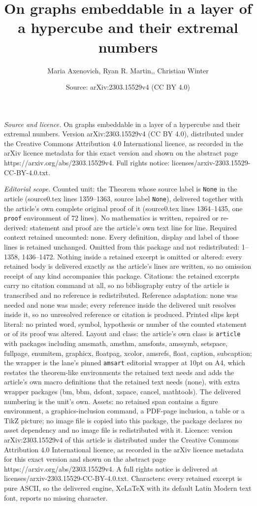 \documentclass[10pt,a4paper]{amsart}
\title[On graphs embeddable in a layer of a hypercube and their ext]{On graphs embeddable in a layer of a hypercube and their extremal numbers}
\author{Maria Axenovich, Ryan R. Martin,, Christian Winter}
\date{Source: arXiv:2303.15529v4 (CC BY 4.0)}
\begin{document}
\maketitle

\noindent\emph{Source and licence.} On graphs embeddable in a layer of a hypercube and their extremal numbers. Version arXiv:2303.15529v4 (CC BY 4.0), distributed under the Creative Commons Attribution 4.0 International licence, as recorded in the arXiv licence metadata for this exact version and shown on the abstract page https://arxiv.org/abs/2303.15529v4. Full rights notice: licenses/arxiv-2303.15529-CC-BY-4.0.txt.\par\smallskip

\noindent\textit{Editorial scope.} Counted unit: the Theorem whose source label is \texttt{None} in the article (source0.tex lines 1359--1363, source label \texttt{None}), delivered together with the article's own complete original proof of it (source0.tex lines 1364--1435, one \texttt{proof} environment of 72 lines). No mathematics is written, repaired or re-derived: statement and proof are the article's own text line for line. Required context retained uncounted: none. Every definition, display and label of those lines is retained unchanged. Omitted from this package and not redistributed: 1--1358, 1436--1472. Nothing inside a retained excerpt is omitted or altered: every retained body is delivered exactly as the article's lines are written, so no omission receipt of any kind accompanies this package. Citations: the retained excerpts carry no citation command at all, so no bibliography entry of the article is transcribed and no reference is redistributed. Reference adaptation: none was needed and none was made; every reference inside the delivered unit resolves inside it, so no unresolved reference or citation is produced. Printed slips kept literal: no printed word, symbol, hypothesis or number of the counted statement or of its proof was altered. Layout and class: the article's own class is \texttt{article} with packages including amsmath, amsthm, amsfonts, amssymb, setspace, fullpage, enumitem, graphicx, floatpag, xcolor, amsrefs, float, caption, subcaption; the wrapper is the lane's pinned \texttt{amsart} editorial wrapper at 10pt on A4, which restates the theorem-like environments the retained text needs and adds the article's own macro definitions that the retained text needs (none), with extra wrapper packages (bm, bbm, dsfont, xspace, cancel, mathtools). The delivered numbering is the unit's own. Assets: no retained span contains a figure environment, a graphics-inclusion command, a PDF-page inclusion, a table or a TikZ picture; no image file is copied into this package, the package declares no asset dependency and no image file is redistributed with it. Licence: version arXiv:2303.15529v4 of this article is distributed under the Creative Commons Attribution 4.0 International licence, as recorded in the arXiv licence metadata for this exact version and shown on the abstract page https://arxiv.org/abs/2303.15529v4. A full rights notice is delivered at licenses/arxiv-2303.15529-CC-BY-4.0.txt. Characters: every retained excerpt is pure ASCII, so the delivered engine, XeLaTeX with its default Latin Modern text font, reports no missing character.
\end{document}
